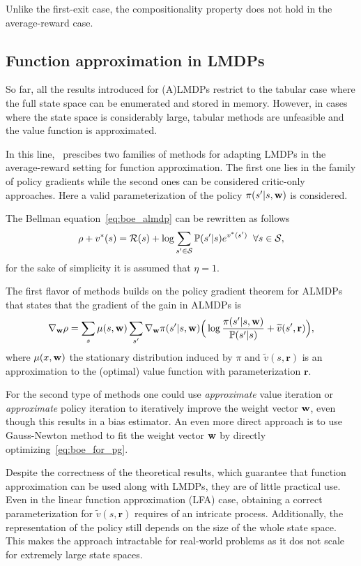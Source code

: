 Unlike the first-exit case, the compositionality property does not hold in the average-reward case.

\subsection{Function approximation in LMDPs}

So far, all the results introduced for (A)LMDPs restrict to the tabular case where the full state space can be enumerated and stored in memory. However, in cases where the state space is considerably large, tabular methods are unfeasible and the value function is approximated.

In this line,~\cite{Todorov2010} prescibes two families of methods for adapting LMDPs in the average-reward setting for function approximation. The first one lies in the family of policy gradients while the second ones can be considered critic-only approaches. Here a valid parameterization of the policy $\pi(s'\lvert s, \mathbf{w})$ is considered.

The Bellman equation~\eqref{eq:boe_almdp} can be rewritten as follows
\begin{equation}
\label{eq:boe_for_pg}
\rho + v^*(s) =\mathcal{R}(s) +\log{\sum_{s'\in\mathcal{S}}\mathbb{P}(s'\lvert s)e^{v^*(s')}} \;\;\forall s\in\mathcal{S},
\end{equation}
for the sake of simplicity it is assumed that $\eta=1$. 

The first flavor of methods builds on the policy gradient theorem for ALMDPs~\citep[cf.~Theorem 1]{Todorov2010} that states that the gradient of the gain in ALMDPs is
\begin{equation}
  \nabla_{\mathbf{w}} \rho = \sum_{s}\mu(s, \mathbf{w}) \sum_{s'} \nabla_{\mathbf{w}} \pi(s'\lvert s, \mathbf{w})\Big( \log \frac{\pi(s'\lvert s, \mathbf{w})}{\mathbb{P}(s'\lvert s)} + \widetilde v(s', \mathbf{r})\Big),
\end{equation}
where $\mu(x, \mathbf{w})$ the stationary distribution induced by $\pi$ and $\widetilde v(s,\mathbf{r})$ is an approximation to the (optimal) value function with parameterization $\mathbf r$.

For the second type of methods one could use \textit{approximate} value iteration or \textit{approximate} policy iteration to iteratively improve the weight vector $\mathbf{w}$, even though this results in a bias estimator. An even more direct approach is to use Gauss-Newton method to fit the weight vector $\mathbf{w}$ by directly optimizing~\eqref{eq:boe_for_pg}.

Despite the correctness of the theoretical results, which guarantee that function approximation can be used along with LMDPs, they are of little practical use. Even in the linear function approximation (LFA) case, obtaining a correct parameterization for $\widetilde v(s,\mathbf{r})$ requires of an intricate process. Additionally, the representation of the policy still depends on the size of the whole state space. This makes the approach intractable for real-world problems as it dos not scale for extremely large state spaces.


